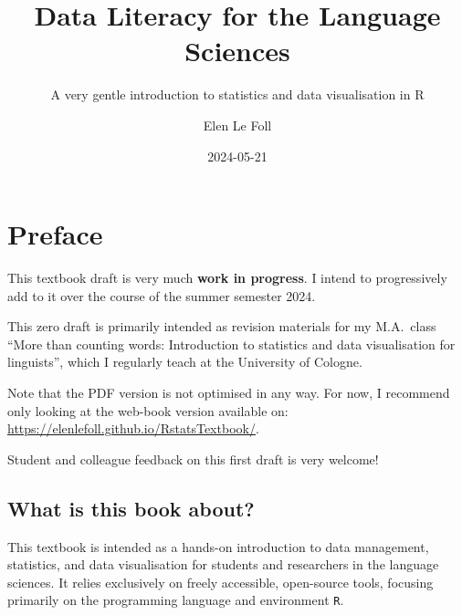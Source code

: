 \documentclass[
  letterpaper,
  DIV=11,
  numbers=noendperiod]{scrreprt}
\title{Data Literacy for the Language Sciences}
\subtitle{A very gentle introduction to statistics and data
visualisation in R}
\author{Elen Le Foll}
\date{2024-05-21}
\renewcommand*\contentsname{Table of contents}
\newcommand\contentsname{Table of contents}
\begin{document}
\maketitle

\renewcommand*\contentsname{Table of contents}
{
\hypersetup{linkcolor=}
\setcounter{tocdepth}{2}
\tableofcontents
}

\chapter*{Preface}\label{preface}


\begin{tcolorbox}[enhanced jigsaw, colback=white, colframe=quarto-callout-warning-color-frame, coltitle=black, toprule=.15mm, bottomtitle=1mm, arc=.35mm, left=2mm, opacityback=0, leftrule=.75mm, toptitle=1mm, titlerule=0mm, title=\textcolor{quarto-callout-warning-color}{\faExclamationTriangle}\hspace{0.5em}{Warning}, opacitybacktitle=0.6, bottomrule=.15mm, colbacktitle=quarto-callout-warning-color!10!white, rightrule=.15mm, breakable]

This textbook draft is very much \textbf{work in progress}. I intend to
progressively add to it over the course of the summer semester 2024.

This zero draft is primarily intended as revision materials for my
M.A.~class ``More than counting words: Introduction to statistics and
data visualisation for linguists'', which I regularly teach at the
University of Cologne.

Note that the PDF version is not optimised in any way. For now, I
recommend only looking at the web-book version available on:
\url{https://elenlefoll.github.io/RstatsTextbook/}.

Student and colleague feedback on this first draft is very welcome!

\end{tcolorbox}

\section*{What is this book about?}\label{what-is-this-book-about}


This textbook is intended as a hands-on introduction to data management,
statistics, and data visualisation for students and researchers in the
language sciences. It relies exclusively on freely accessible,
open-source tools, focusing primarily on the programming language and
environment \texttt{R}.
\end{document}
